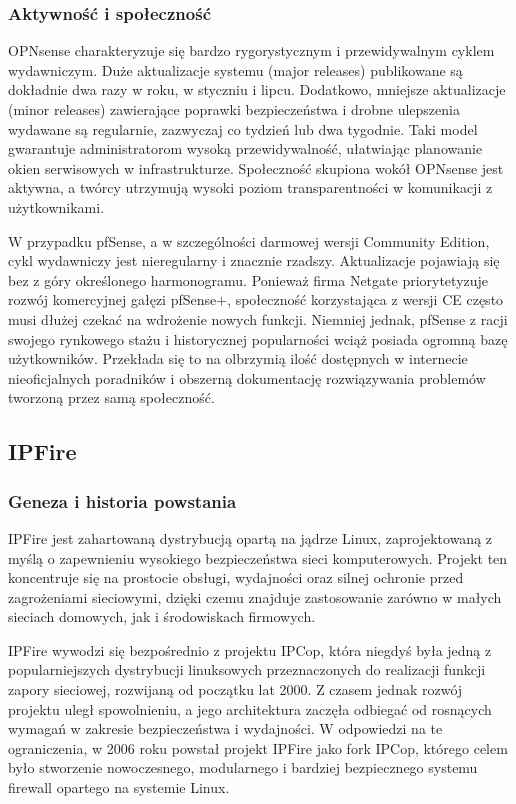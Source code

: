 \documentclass[12pt,a4paper]{article}
\begin{document}
\subsubsection{Aktywność i społeczność}
OPNsense charakteryzuje się bardzo rygorystycznym i przewidywalnym cyklem wydawniczym. Duże aktualizacje systemu (major releases) publikowane są dokładnie dwa razy w roku, w styczniu i lipcu. Dodatkowo, mniejsze aktualizacje (minor releases) zawierające poprawki bezpieczeństwa i drobne ulepszenia wydawane są regularnie, zazwyczaj co tydzień lub dwa tygodnie. Taki model gwarantuje administratorom wysoką przewidywalność, ułatwiając planowanie okien serwisowych w infrastrukturze. Społeczność skupiona wokół OPNsense jest aktywna, a twórcy utrzymują wysoki poziom transparentności w komunikacji z użytkownikami.

W przypadku pfSense, a w szczególności darmowej wersji Community Edition, cykl wydawniczy jest nieregularny i znacznie rzadszy. Aktualizacje pojawiają się bez z góry określonego harmonogramu. Ponieważ firma Netgate priorytetyzuje rozwój komercyjnej gałęzi pfSense+, społeczność korzystająca z wersji CE często musi dłużej czekać na wdrożenie nowych funkcji. Niemniej jednak, pfSense z racji swojego rynkowego stażu i historycznej popularności wciąż posiada ogromną bazę użytkowników. Przekłada się to na olbrzymią ilość dostępnych w internecie nieoficjalnych poradników i obszerną dokumentację rozwiązywania problemów tworzoną przez samą społeczność.

\subsection{IPFire}

\subsubsection{Geneza i historia powstania}
IPFire jest zahartowaną dystrybucją opartą na jądrze Linux, zaprojektowaną z myślą o zapewnieniu wysokiego bezpieczeństwa sieci komputerowych. Projekt ten koncentruje się na prostocie obsługi, wydajności oraz silnej ochronie przed zagrożeniami sieciowymi, dzięki czemu znajduje zastosowanie zarówno w małych sieciach domowych, jak i środowiskach firmowych.

IPFire wywodzi się bezpośrednio z projektu IPCop, która niegdyś była jedną z popularniejszych dystrybucji linuksowych przeznaczonych do realizacji funkcji zapory sieciowej, rozwijaną od początku lat 2000. Z czasem jednak rozwój projektu uległ spowolnieniu, a jego architektura zaczęła odbiegać od rosnących wymagań w zakresie bezpieczeństwa i wydajności. W odpowiedzi na te ograniczenia, w 2006 roku powstał projekt IPFire jako fork IPCop, którego celem było stworzenie nowoczesnego, modularnego i bardziej bezpiecznego systemu firewall opartego na systemie Linux.
\end{document}
